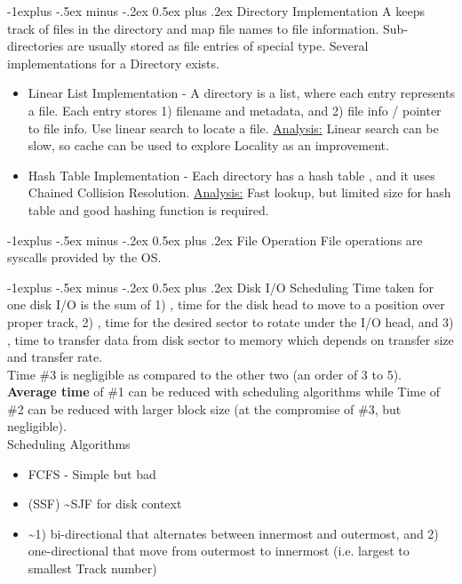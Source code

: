 \documentclass[10pt,landscape,letterpaper]{article}
\makeatletter
\renewcommand{\subsection}{\@startsection{subsection}{2}{0mm}%
                                {-1explus -.5ex minus -.2ex}%
                                {0.5ex plus .2ex}%
                                {\sffamily\normalsize\itshape}}
\makeatother
\begin{document}
\begin{multicols}{3}
\subsection{Directory Implementation}
A  keeps track of files in the directory and map file names to file information. Sub-directories are usually stored as file entries of special type. Several implementations for a Directory exists.
\begin{itemize}
    \item Linear List Implementation - A directory is a list, where each entry represents a file. Each entry stores 1) filename and metadata, and 2) file info / pointer to file info. Use linear search to locate a file. \underline{Analysis:} Linear search can be slow, so cache can be used to explore Locality as an improvement.
    \item Hash Table Implementation - Each directory has a hash table , and it uses Chained Collision Resolution. \underline{Analysis:} Fast lookup, but limited size for hash table and good hashing function is required.
\end{itemize}


\subsection{File Operation}
File operations are syscalls provided by the OS.



\subsection{Disk I/O Scheduling}
Time taken for one disk I/O is the sum of 1) , time for the disk head to move to a position over proper track, 2) , time for the desired sector to rotate under the I/O head, and 3) , time to transfer data from disk sector to memory which depends on transfer size and transfer rate. 
\\
Time \#3 is negligible as compared to the other two (an order of 3 to 5). \textbf{Average time} of \#1 can be reduced with scheduling algorithms while Time of \#2 can be reduced with larger block size (at the compromise of \#3, but negligible).
\\
Scheduling Algorithms
\begin{itemize}
    \item FCFS - Simple but bad
    \item {} (SSF) \textasciitilde SJF for disk context
    \item {} \textasciitilde 1) bi-directional  that alternates between innermost and outermost, and 2) one-directional  that move from outermost to innermost (i.e. largest to smallest Track number)
\end{itemize}




\end{multicols}
\end{document}
